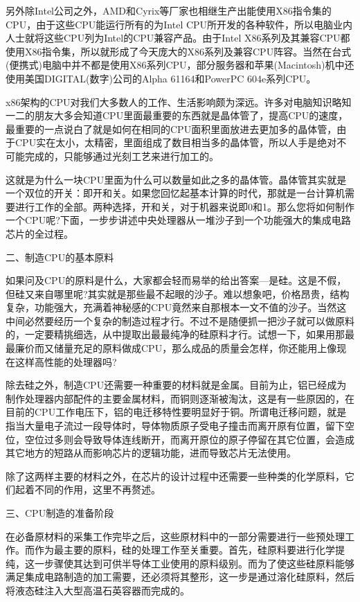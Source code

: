 \documentclass[utf8]{book}
\begin{document}
	另外除Intel公司之外，AMD和Cyrix等厂家也相继生产出能使用X86指令集的CPU，由于这些CPU能运行所有的为Intel CPU所开发的各种软件，所以电脑业内人士就将这些CPU列为Intel的CPU兼容产品。由于Intel X86系列及其兼容CPU都使用X86指令集，所以就形成了今天庞大的X86系列及兼容CPU阵容。当然在台式(便携式)电脑中并不都是使用X86系列CPU，部分服务器和苹果(Macintosh)机中还使用美国DIGITAL(数字)公司的Alpha 61164和PowerPC 604e系列CPU。
	
	x86架构的CPU对我们大多数人的工作、生活影响颇为深远。许多对电脑知识略知一二的朋友大多会知道CPU里面最重要的东西就是晶体管了，提高CPU的速度，最重要的一点说白了就是如何在相同的CPU面积里面放进去更加多的晶体管，由于CPU实在太小，太精密，里面组成了数目相当多的晶体管，所以人手是绝对不可能完成的，只能够通过光刻工艺来进行加工的。
	
	这就是为什么一块CPU里面为什么可以数量如此之多的晶体管。晶体管其实就是一个双位的开关：即开和关。如果您回忆起基本计算的时代，那就是一台计算机需要进行工作的全部。两种选择，开和关，对于机器来说即0和1。那么您将如何制作一个CPU呢?下面，一步步讲述中央处理器从一堆沙子到一个功能强大的集成电路芯片的全过程。
	
	二、制造CPU的基本原料
	
	如果问及CPU的原料是什么，大家都会轻而易举的给出答案—是硅。这是不假，但硅又来自哪里呢?其实就是那些最不起眼的沙子。难以想象吧，价格昂贵，结构复杂，功能强大，充满着神秘感的CPU竟然来自那根本一文不值的沙子。当然这中间必然要经历一个复杂的制造过程才行。不过不是随便抓一把沙子就可以做原料的，一定要精挑细选，从中提取出最最纯净的硅原料才行。试想一下，如果用那最最廉价而又储量充足的原料做成CPU，那么成品的质量会怎样，你还能用上像现在这样高性能的处理器吗?
	
	除去硅之外，制造CPU还需要一种重要的材料就是金属。目前为止，铝已经成为制作处理器内部配件的主要金属材料，而铜则逐渐被淘汰，这是有一些原因的，在目前的CPU工作电压下，铝的电迁移特性要明显好于铜。所谓电迁移问题，就是指当大量电子流过一段导体时，导体物质原子受电子撞击而离开原有位置，留下空位，空位过多则会导致导体连线断开，而离开原位的原子停留在其它位置，会造成其它地方的短路从而影响芯片的逻辑功能，进而导致芯片无法使用。
	
	除了这两样主要的材料之外，在芯片的设计过程中还需要一些种类的化学原料，它们起着不同的作用，这里不再赘述。
	
	三、CPU制造的准备阶段
	
	在必备原材料的采集工作完毕之后，这些原材料中的一部分需要进行一些预处理工作。而作为最主要的原料，硅的处理工作至关重要。首先，硅原料要进行化学提纯，这一步骤使其达到可供半导体工业使用的原料级别。而为了使这些硅原料能够满足集成电路制造的加工需要，还必须将其整形，这一步是通过溶化硅原料，然后将液态硅注入大型高温石英容器而完成的。
	
\end{document}
